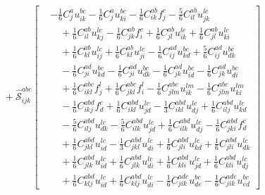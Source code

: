 \begin{align}
&\quad {}+ \widehat{\mathcal S}^{abc}_{ijk}\left[\begin{aligned}& -\frac{1}{6} C^{a}_{j} u^{bc}_{ik} - \frac{1}{6} C^{a}_{j} u^{bc}_{ki} - \frac{1}{6} C^{ab}_{ik} f^{c}_{j} - \frac{5}{6} C^{ab}_{il} u^{lc}_{jk} \\ &\quad {}+ \frac{1}{6} C^{ab}_{il} u^{lc}_{kj} - \frac{1}{6} C^{ab}_{jk} f^{c}_{i} + \frac{1}{6} C^{ab}_{jl} u^{lc}_{ik} + \frac{1}{6} C^{ab}_{jl} u^{lc}_{ki} \\ &\quad {}+ \frac{1}{6} C^{ab}_{kl} u^{lc}_{ij} + \frac{1}{6} C^{ab}_{kl} u^{lc}_{ji} - \frac{1}{6} C^{ad}_{ij} u^{bc}_{kd} + \frac{5}{6} C^{ad}_{ij} u^{bc}_{dk} \\ &\quad -\frac{1}{6} C^{ad}_{ji} u^{bc}_{kd} - \frac{1}{6} C^{ad}_{ji} u^{bc}_{dk} - \frac{1}{6} C^{ad}_{jk} u^{bc}_{id} - \frac{1}{6} C^{ad}_{jk} u^{bc}_{di} \\ &\quad {}+ \frac{1}{6} C^{abc}_{ikl} f^{l}_{j} + \frac{1}{6} C^{abc}_{jkl} f^{l}_{i} - \frac{1}{6} C^{abc}_{jlm} u^{lm}_{ik} - \frac{1}{6} C^{abc}_{jlm} u^{lm}_{ki} \\ &\quad -\frac{1}{6} C^{abd}_{ikj} f^{c}_{d} + \frac{1}{6} C^{abd}_{ikl} u^{lc}_{jd} - \frac{1}{3} C^{abd}_{ikl} u^{lc}_{dj} + \frac{1}{6} C^{abd}_{ilj} u^{lc}_{kd} \\ &\quad -\frac{5}{6} C^{abd}_{ilj} u^{lc}_{dk} - \frac{5}{6} C^{abd}_{ilk} u^{lc}_{jd} + \frac{1}{6} C^{abd}_{ilk} u^{lc}_{dj} - \frac{1}{6} C^{abd}_{jki} f^{c}_{d} \\ &\quad {}+ \frac{1}{6} C^{abd}_{jkl} u^{lc}_{id} - \frac{1}{3} C^{abd}_{jkl} u^{lc}_{di} + \frac{1}{6} C^{abd}_{jli} u^{lc}_{kd} + \frac{1}{6} C^{abd}_{jli} u^{lc}_{dk} \\ &\quad {}+ \frac{1}{6} C^{abd}_{jlk} u^{lc}_{id} + \frac{1}{6} C^{abd}_{jlk} u^{lc}_{di} + \frac{1}{6} C^{abd}_{kli} u^{lc}_{jd} + \frac{1}{6} C^{abd}_{kli} u^{lc}_{dj} \\ &\quad {}+ \frac{1}{6} C^{abd}_{klj} u^{lc}_{id} + \frac{1}{6} C^{abd}_{klj} u^{lc}_{di} - \frac{1}{6} C^{ade}_{jik} u^{bc}_{de} - \frac{1}{6} C^{ade}_{jik} u^{bc}_{ed}\end{aligned}\right]
\end{align}
